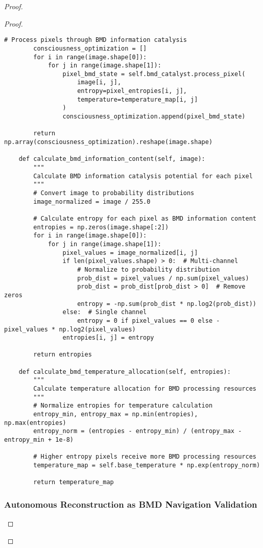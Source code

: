\documentclass[12pt,a4paper]{article}
\begin{document}
\begin{proof}
{\begin{proof}
\begin{lstlisting}[style=pythonstyle, caption=BMD Thermodynamic Pixel Processing]
        # Process pixels through BMD information catalysis
        consciousness_optimization = []
        for i in range(image.shape[0]):
            for j in range(image.shape[1]):
                pixel_bmd_state = self.bmd_catalyst.process_pixel(
                    image[i, j],
                    entropy=pixel_entropies[i, j],
                    temperature=temperature_map[i, j]
                )
                consciousness_optimization.append(pixel_bmd_state)
        
        return np.array(consciousness_optimization).reshape(image.shape)
    
    def calculate_bmd_information_content(self, image):
        """
        Calculate BMD information catalysis potential for each pixel
        """
        # Convert image to probability distributions
        image_normalized = image / 255.0
        
        # Calculate entropy for each pixel as BMD information content
        entropies = np.zeros(image.shape[:2])
        for i in range(image.shape[0]):
            for j in range(image.shape[1]):
                pixel_values = image_normalized[i, j]
                if len(pixel_values.shape) > 0:  # Multi-channel
                    # Normalize to probability distribution
                    prob_dist = pixel_values / np.sum(pixel_values)
                    prob_dist = prob_dist[prob_dist > 0]  # Remove zeros
                    entropy = -np.sum(prob_dist * np.log2(prob_dist))
                else:  # Single channel
                    entropy = 0 if pixel_values == 0 else -pixel_values * np.log2(pixel_values)
                entropies[i, j] = entropy
        
        return entropies
    
    def calculate_bmd_temperature_allocation(self, entropies):
        """
        Calculate temperature allocation for BMD processing resources
        """
        # Normalize entropies for temperature calculation
        entropy_min, entropy_max = np.min(entropies), np.max(entropies)
        entropy_norm = (entropies - entropy_min) / (entropy_max - entropy_min + 1e-8)
        
        # Higher entropy pixels receive more BMD processing resources
        temperature_map = self.base_temperature * np.exp(entropy_norm)
        
        return temperature_map
\end{lstlisting}

\subsubsection{Autonomous Reconstruction as BMD Navigation Validation}


\end{proof}}
\end{proof}
\end{document}
